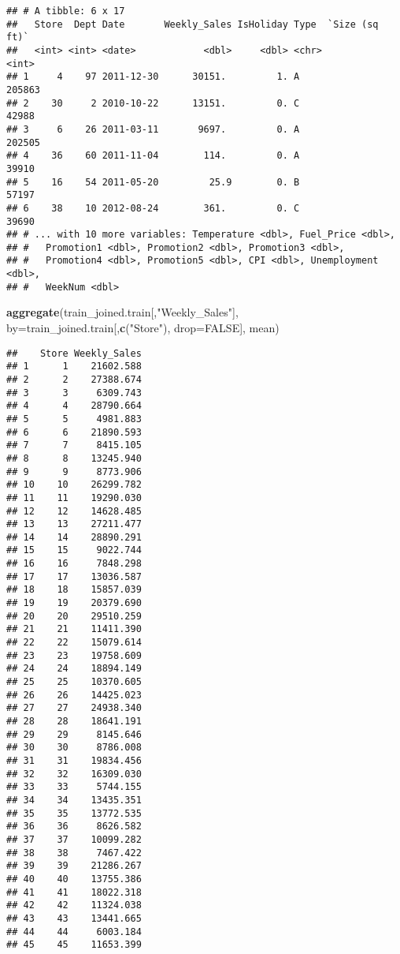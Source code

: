 \documentclass[11pt,]{article}
\newenvironment{Shaded}{\begin{snugshade}}{\end{snugshade}}
\newcommand{\KeywordTok}[1]{\textcolor[rgb]{0.13,0.29,0.53}{\textbf{{#1}}}}
\newcommand{\DataTypeTok}[1]{\textcolor[rgb]{0.13,0.29,0.53}{{#1}}}
\newcommand{\StringTok}[1]{\textcolor[rgb]{0.31,0.60,0.02}{{#1}}}
\newcommand{\OtherTok}[1]{\textcolor[rgb]{0.56,0.35,0.01}{{#1}}}
\newcommand{\NormalTok}[1]{{#1}}
\begin{document}
\begin{verbatim}
## # A tibble: 6 x 17
##   Store  Dept Date       Weekly_Sales IsHoliday Type  `Size (sq ft)`
##   <int> <int> <date>            <dbl>     <dbl> <chr>          <int>
## 1     4    97 2011-12-30      30151.         1. A             205863
## 2    30     2 2010-10-22      13151.         0. C              42988
## 3     6    26 2011-03-11       9697.         0. A             202505
## 4    36    60 2011-11-04        114.         0. A              39910
## 5    16    54 2011-05-20         25.9        0. B              57197
## 6    38    10 2012-08-24        361.         0. C              39690
## # ... with 10 more variables: Temperature <dbl>, Fuel_Price <dbl>,
## #   Promotion1 <dbl>, Promotion2 <dbl>, Promotion3 <dbl>,
## #   Promotion4 <dbl>, Promotion5 <dbl>, CPI <dbl>, Unemployment <dbl>,
## #   WeekNum <dbl>
\end{verbatim}

\begin{Shaded}
\begin{Highlighting}[]
\KeywordTok{aggregate}\NormalTok{(train_joined.train[,}\StringTok{"Weekly_Sales"}\NormalTok{], }\DataTypeTok{by=}\NormalTok{train_joined.train[,}\KeywordTok{c}\NormalTok{(}\StringTok{"Store"}\NormalTok{), }\DataTypeTok{drop=}\OtherTok{FALSE}\NormalTok{], mean)}
\end{Highlighting}
\end{Shaded}

\begin{verbatim}
##    Store Weekly_Sales
## 1      1    21602.588
## 2      2    27388.674
## 3      3     6309.743
## 4      4    28790.664
## 5      5     4981.883
## 6      6    21890.593
## 7      7     8415.105
## 8      8    13245.940
## 9      9     8773.906
## 10    10    26299.782
## 11    11    19290.030
## 12    12    14628.485
## 13    13    27211.477
## 14    14    28890.291
## 15    15     9022.744
## 16    16     7848.298
## 17    17    13036.587
## 18    18    15857.039
## 19    19    20379.690
## 20    20    29510.259
## 21    21    11411.390
## 22    22    15079.614
## 23    23    19758.609
## 24    24    18894.149
## 25    25    10370.605
## 26    26    14425.023
## 27    27    24938.340
## 28    28    18641.191
## 29    29     8145.646
## 30    30     8786.008
## 31    31    19834.456
## 32    32    16309.030
## 33    33     5744.155
## 34    34    13435.351
## 35    35    13772.535
## 36    36     8626.582
## 37    37    10099.282
## 38    38     7467.422
## 39    39    21286.267
## 40    40    13755.386
## 41    41    18022.318
## 42    42    11324.038
## 43    43    13441.665
## 44    44     6003.184
## 45    45    11653.399
\end{verbatim}
\end{document}
